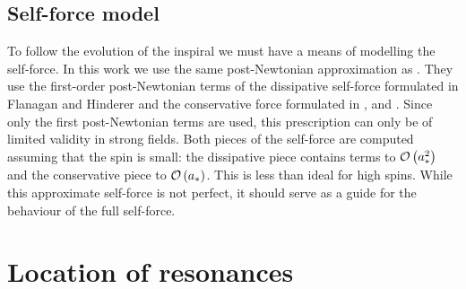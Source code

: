 \subsection{Self-force model}

To follow the evolution of the inspiral we must have a means of modelling the self-force. In this work we use the same post-Newtonian approximation as \citet{Flanagan2012}. They use the first-order post-Newtonian terms of the dissipative self-force formulated in Flanagan and Hinderer \citep{Flanagan2007} and the conservative force formulated in \citet{Iyer1993}, and \citet{Kidder1995}. Since only the first post-Newtonian terms are used, this prescription can only be of limited validity in strong fields. Both pieces of the self-force are computed assuming that the spin is small: the dissipative piece contains terms to $\mathcal{O}\left({a_\ast^2}\right)$ and the conservative piece to $\mathcal{O}\left({a_\ast}\right)$. This is less than ideal for high spins. While this approximate self-force is not perfect, it should serve as a guide for the behaviour of the full self-force.


\section{Location of resonances}


